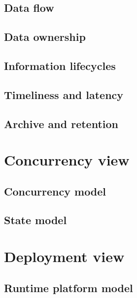 \documentclass[a4paper,11pt]{report}
\begin{document}
\subsection{Data flow}
\label{sec:data-flow}


\subsection{Data ownership}
\label{sec:data-ownership}


\subsection{Information lifecycles}
\label{sec:inform-lifecycl}


\subsection{Timeliness and latency}
\label{sec:timeliness-latency}


\subsection{Archive and retention}
\label{sec:archive-retention}


\section{Concurrency view}
\label{sec:concurrency-view}


\subsection{Concurrency model}
\label{sec:concurrency-model}


\subsection{State model}
\label{sec:state-model}


\section{Deployment view}
\label{sec:deployment-view}


\subsection{Runtime platform model}
\label{sec:runt-platf-model}
\end{document}
